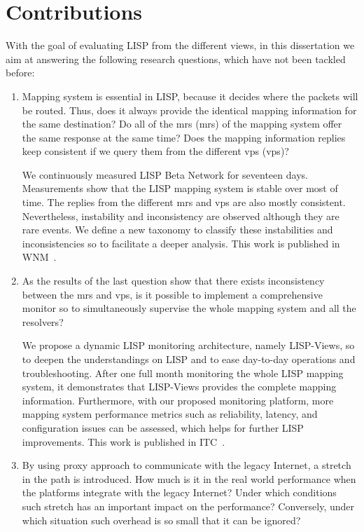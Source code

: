 \section{Contributions}
\label{sec:intro_contributions}
With the goal of evaluating LISP from the different views, in this dissertation we aim at answering the following research questions, which have not been tackled before:
\begin{enumerate}[noitemsep,topsep=0pt]
	\item Mapping system is essential in LISP, because it decides where the packets will be routed. Thus, does it always provide the identical mapping information for the same destination? Do all of the \acrlong{mr}s (\acrshort{mr}s) of the mapping system offer the same response at the same time? Does the mapping information replies keep consistent if we query them from the different \acrlong{vp}s (\acrshort{vp}s)?
	
	We continuously measured LISP Beta Network for seventeen days. Measurements show that the LISP mapping system is stable over most of time. The replies from the different \acrshort{mr}s and \acrshort{vp}s are also mostly consistent. Nevertheless, instability and inconsistency are observed although they are rare events. We define a new taxonomy to classify these instabilities and inconsistencies so to facilitate a deeper analysis. This work is published in WNM~\cite{yue2016stability}.
	
	\item As the results of the last question show that there exists inconsistency between the \acrshort{mr}s and \acrshort{vp}s, is it possible to implement a comprehensive monitor so to simultaneously supervise the whole mapping system and all the resolvers?
	
	We propose a dynamic LISP monitoring architecture, namely LISP-Views, so to deepen the understandings on LISP and to ease day-to-day operations and troubleshooting. After one full month monitoring the whole LISP mapping system, it demonstrates that LISP-Views provides %
	the complete mapping information. Furthermore, with our proposed monitoring platform, more mapping system performance metrics such as reliability, latency, and configuration issues can be assessed, which helps for further LISP improvements. This work is published in ITC~\cite{li2017lisp}.
	
	\item By using proxy approach to communicate with the legacy Internet, a stretch in the path is introduced. How much is it in the real world performance when the platforms integrate with the legacy Internet? Under which conditions such stretch has an important impact on the performance? Conversely, under which situation such overhead is so small that it can be ignored? 
	

\end{enumerate}
